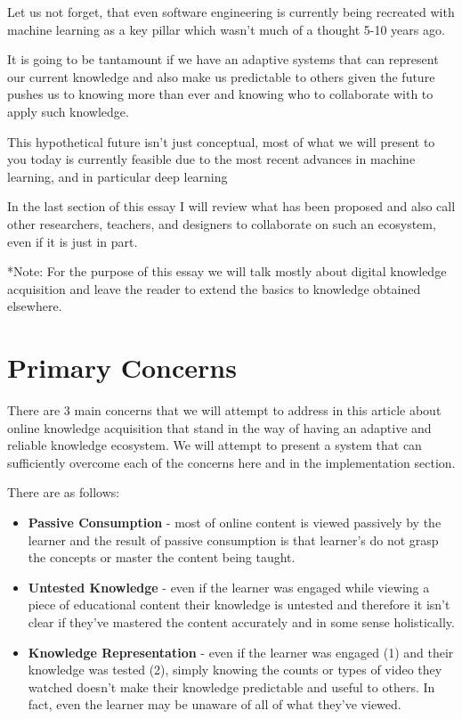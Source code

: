 \documentclass{acm_proc_article-sp}
\begin{document}
Let us not forget, that even software engineering is currently being
recreated with machine learning as a key pillar which wasn't much of a
thought 5-10 years ago.

It is going to be tantamount if we have an adaptive systems that can
represent our current knowledge and also make us predictable to others
given the future pushes us to knowing more than ever and knowing who to
collaborate with to apply such knowledge.

This hypothetical future isn't just conceptual, most of what we will
present to you today is currently feasible due to the most recent
advances in machine learning, and in particular deep learning

In the last section of this essay I will review what has been proposed
and also call other researchers, teachers, and designers to collaborate
on such an ecosystem, even if it is just in part.

*Note: For the purpose of this essay we will talk mostly about digital
knowledge acquisition and leave the reader to extend the basics to
knowledge obtained elsewhere.

\section{Primary Concerns}\label{primary-concerns}

There are 3 main concerns that we will attempt to address in this
article about online knowledge acquisition that stand in the way of
having an adaptive and reliable knowledge ecosystem. We will attempt to
present a system that can sufficiently overcome each of the concerns
here and in the implementation section.

There are as follows:

\begin{itemize}
\item
  \textbf{Passive Consumption} - most of online content is viewed
  passively by the learner and the result of passive consumption is that
  learner's do not grasp the concepts or master the content being
  taught.
\item
  \textbf{Untested Knowledge} - even if the learner was engaged while
  viewing a piece of educational content their knowledge is untested and
  therefore it isn't clear if they've mastered the content accurately
  and in some sense holistically.
\item
  \textbf{Knowledge Representation} - even if the learner was engaged
  (1) and their knowledge was tested (2), simply knowing the counts or
  types of video they watched doesn't make their knowledge predictable
  and useful to others. In fact, even the learner may be unaware of all
  of what they've viewed.
\end{itemize}
\end{document}
